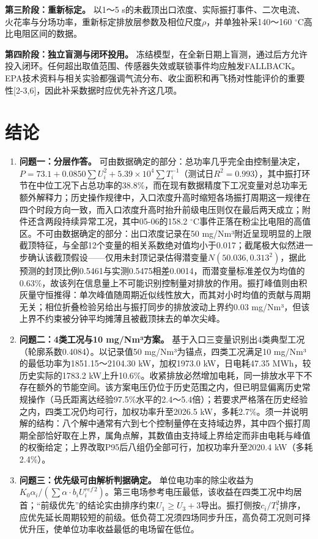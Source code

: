 \documentclass[UTF8,zihao=5,a4paper]{ctexart}
\begin{document}
\textbf{第三阶段：重新标定。} 以1～5 s的未截顶出口浓度、实际振打事件、二次电流、火花率与分场功率，重新标定排放层参数及相位尺度$\rho$，并单独补采140～160 $^\circ$C高比电阻区间的数据。

\textbf{第四阶段：独立盲测与闭环投用。} 冻结模型，在全新日期上盲测，通过后方允许投入闭环。任何超出取值范围、传感器失效或联锁事件均应触发FALLBACK。EPA技术资料与相关实验都强调气流分布、收尘面积和再飞扬对性能评价的重要性[2-3,6]，因此补采数据时应优先补齐这几项。

\section{结论}

\begin{enumerate}[itemsep=1pt,topsep=3pt]
\item \textbf{问题一：分层作答。} 可由数据确定的部分：总功率几乎完全由控制量决定，$P=73.1+0.0850\sum U_i^2+5.39\times10^4\sum T_i^{-1}$（测试日$R^2=0.993$），其中振打环节在中位工况下占总功率的38.8\%，而在现有数据精度下工况变量对总功率无额外解释力；历史操作规律中，入口浓度升高时缩短各场振打周期这一规律在四个时段方向一致，而入口浓度升高时抬升前级电压则仅在最后两天成立；附件还含两段持续异常工况，其中05-06的158.2 $^\circ$C事件正落在粉尘比电阻的高值区。不可由数据确定的部分：出口浓度记录在50 mg/Nm³附近呈现明显的上限截顶特征，与全部12个变量的相关系数绝对值均小于0.017；截尾极大似然进一步确认该截顶假设——仅用未封顶记录估得潜变量$N(50.036,0.313^2)$，据此预测的封顶比例0.5461与实测0.5475相差0.0014，而潜变量标准差仅为均值的0.63\%，故该列在信息量上不可能识别控制量对排放的作用。振打峰值则由积灰量守恒推得：单次峰值随周期近似线性放大，而其对小时均值的贡献与周期无关；相位折叠检验另给出与振打同步的排放波动上界约0.03 mg/Nm³，但该上界不约束被分钟平均摊薄且被截顶抹去的单次尖峰。
\item \textbf{问题二：4类工况与10 mg/Nm³方案。} 基于入口三变量识别出4类典型工况（轮廓系数0.4084）。以记录值50 mg/Nm³为锚点，四类工况满足10 mg/Nm³的最低功率为1851.15～2104.30 kW，加权1973.0 kW，日电耗47.35 MWh，较历史实际的1783.2 kW上升10.6\%。收紧排放必然增加电耗，同一排放水平下不存在额外的节能空间。该方案电压仍位于历史范围之内，但已明显偏离历史常规操作（马氏距离达经验97.5\%水平的2.4～5.4倍）；若要求严格落在历史经验之内，四类工况仍均可行，加权功率升至2026.5 kW，多耗2.7\%。须一并说明解的结构：八个解中通常有六到七个控制量停在支持域边界，其中四个振打周期全部恰好取在上界，属角点解，其数值由支持域上界给定而非由电耗与峰值的权衡给定；上界改取P95后八组仍全部可行，加权功率升至2020.4 kW（多耗2.4\%）。
\item \textbf{问题三：优先级可由解析判据确定。} 单位电功率的除尘收益为$K_0\alpha_i/(\sum\alpha\cdot b_iU^{ref\,2}_i)$。第三电场参考电压最低，该收益在四类工况中均居首；“前级优先”的结论实由排序约束$U_1\ge U_3+3$导出。振打侧按$c_i/T_i^2$排序，应优先延长周期较短的前级。低负荷工况须四场同步升压，高负荷工况则可择优升压，使单位功率收益最低的电场留在低位。

\end{enumerate}
\end{document}
